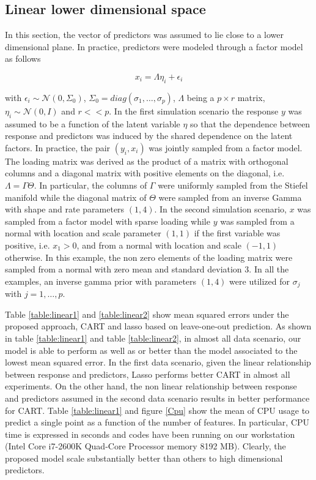 \documentclass{article} %
\providecommand{\mc}[1]{\mathcal{#1}}
\begin{document}

\subsection{Linear lower dimensional space} \label{section:linear}

In this section, the vector of predictors was assumed to lie close to a lower dimensional plane. In practice,  predictors were modeled through a factor model as follows 

\begin{equation} x_i=\Lambda \eta_i + \epsilon_i \end{equation} 

with $\epsilon_i \sim \mc{N}(0,\Sigma_0)$, $\Sigma_0=diag(\sigma_1, \ldots, \sigma_p)$, $\Lambda$ being a $p \times r$ matrix, $\eta_i \sim \mc{N}(0,I)$ and $r<<p$. In the first simulation scenario the response $y$ was assumed to be a function of the latent variable $\eta$ so that  the dependence between response and predictors was induced by the shared dependence on the latent factors. In practice, the pair $(y_i, x_i)$ was jointly sampled from a factor model. The loading matrix was derived as the product of a matrix with orthogonal columns and a diagonal matrix with positive elements on the diagonal, i.e. $\Lambda=\Gamma \Theta$. In particular, the columns of $\Gamma$ were uniformly sampled from the Stiefel manifold while the diagonal matrix of $\Theta$ were sampled from an inverse Gamma with shape and rate parameters $(1,4)$. In the second simulation scenario, $x$ was sampled from a factor model with sparse loading while $y$ was sampled from a normal with location and scale parameter $(1,1)$ if the first variable was positive, i.e. $x_1>0$, and from a normal with location and scale $(-1,1)$ otherwise. In this example, the non zero elements of the loading matrix were sampled from a normal with zero mean and standard deviation $3$. In all the examples, an inverse gamma prior with parameters $(1,4)$ were utilized for $\sigma_j$ with $j=1, \ldots, p$.

Table \ref{table:linear1} and \ref{table:linear2} show mean squared errors under the proposed approach, CART and lasso based on leave-one-out prediction. As shown in table \ref{table:linear1} and table \ref{table:linear2}, in almost all data scenario, our model is able to perform as well as or better than the model associated to the lowest mean squared error. In the first data scenario, given the linear relationship between response and predictors, Lasso performs better CART in almost all experiments. On the other hand, the non linear relationship between response and predictors assumed in the second data scenario results in better performance for CART. Table \ref{table:linear1} and figure \ref{Cpu} show the mean of CPU usage to predict a single point as a function of the number of features. In particular, CPU time is expressed in seconds and codes have been running on our workstation (Intel Core i7-2600K Quad-Core Processor memory 8192 MB).  Clearly, the proposed model scale substantially better than others to high dimensional predictors. 
\end{document}
